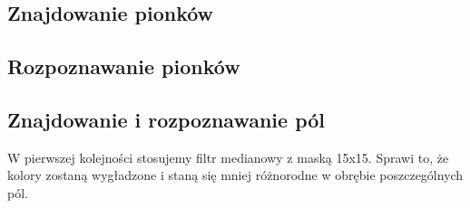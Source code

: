 \documentclass[a4paper]{article}
\begin{document}
    \subsection{Znajdowanie pionków}

    \subsection{Rozpoznawanie pionków}

    \subsection{Znajdowanie i rozpoznawanie pól}
    W pierwszej kolejności stosujemy filtr medianowy z maską 15x15. Sprawi to, że kolory zostaną wygładzone i staną się mniej różnorodne w obrębie poszczególnych pól.
    
\end{document}
